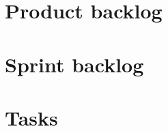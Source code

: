 \documentclass[10pt, a4paper]{article}
\begin{document}
	\section{Product backlog}
		

	\section{Sprint backlog}
		

	\section{Tasks}
		
\end{document}
